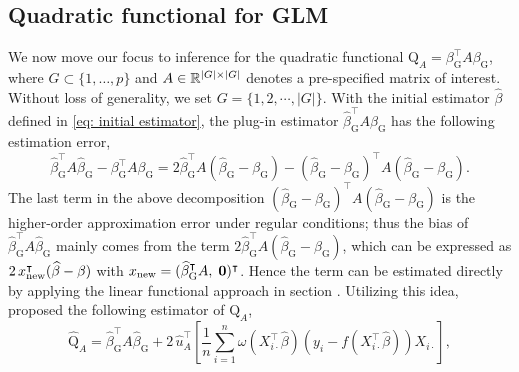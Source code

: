 \subsection{Quadratic functional for GLM}
\label{subsec: QF-unified}
We now move our focus to inference for the quadratic functional $\mathrm{Q}_A =\beta_{\mathrm{G}}^\intercal A \beta_{\mathrm{G}}$, where $G \subset \{1,\ldots, p\}$ and $A \in \mathbb{R}^{|G|\times |G|}$ denotes a pre-specified matrix of interest. Without loss of generality, we set $G=\{1,2,\cdots,|G|\}$. %
With the initial estimator $\widehat{\beta}$ defined in \eqref{eq: initial estimator}, the plug-in estimator $\widehat{\beta}_{\mathrm{G}}^\intercal A \widehat{\beta}_{\mathrm{G}}$ has the following estimation error,
\begin{equation*}
    \widehat{\beta}_{\textrm{G}}^\intercal A \widehat{\beta}_{\textrm{G}} - \beta_{\textrm{G}}^\intercal A \beta_{\textrm{G}} = 2 \widehat{\beta}_{\textrm{G}}^\intercal A ( \widehat{\beta}_{\textrm{G}} - \beta_{\textrm{G}} ) - ( \widehat{\beta}_{\textrm{G}} - \beta_{\textrm{G}} )^\intercal A ( \widehat{\beta}_{\textrm{G}} - \beta_{\textrm{G}} ).
\end{equation*}
The last term in the above decomposition $( \widehat{\beta}_{\textrm{G}} - \beta_{\textrm{G}} )^\intercal A ( \widehat{\beta}_{\textrm{G}} - \beta_{\textrm{G}} )$ is the higher-order approximation error under regular conditions; thus the bias of $\widehat{\beta}_{\textrm{G}}^\intercal A \widehat{\beta}_{\textrm{G}}$  mainly comes from the term $2 \widehat{\beta}_{\textrm{G}}^\intercal A ( \widehat{\beta}_{\textrm{G}} - \beta_{\textrm{G}} )$, which can be expressed as $2 \,x_{\rm new}^\intercal (\widehat{\beta} - \beta)$ with $x_{\rm new} = ( \widehat{\beta}_{\textrm{G}}^\intercal A, \; \mathbf{0})^\intercal$. Hence the term can be estimated directly by applying the linear functional approach in section . Utilizing this idea, \citet{guo2021group, guo2019optimal} proposed the following estimator of $\mathrm{Q}_A$,
\begin{equation}
    \widehat{\mathrm{Q}}_A = \widehat{\beta}_{\textrm{G}}^\intercal A \widehat{\beta}_{\textrm{G}} + 2\, \widehat{u}_A^\intercal \left[ \frac{1}{n} \sum_{i=1}^n \omega(X_{i\cdot}^\intercal \widehat{\beta}) \left(y_i - f(X_{i\cdot}^\intercal \widehat{\beta})\right) X_{i\cdot} \right], 
    \label{eq: QF point estimator - known - unified}
\end{equation}
